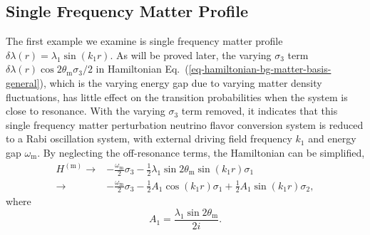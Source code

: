 \documentclass[%
reprint,
 amsmath,amssymb,
 aps,
]{revtex4-1}
\begin{document}





\subsection{\label{sec:single-freq}Single Frequency Matter Profile}


The first example we examine is single frequency matter profile $\delta\lambda(r) = \lambda_1 \sin(k_1 r)$. As will be proved later, the varying $\sigma_3$ term $\delta\lambda(r) \cos 2\theta_{\mathrm m} \sigma_3/2$ in Hamiltonian Eq.~(\ref{eq-hamiltonian-bg-matter-basis-general}), which is the varying energy gap due to varying matter density fluctuations, has little effect on the transition probabilities when the system is close to resonance. With the varying $\sigma_3$ term removed, it indicates that this single frequency matter perturbation neutrino flavor conversion system is reduced to a Rabi oscillation system, with external driving field frequency $k_1$ and energy gap $\omega_{\mathrm m}$. By neglecting the off-resonance terms, the Hamiltonian can be simplified,
\begin{align}
H^{(\mathrm{m})} \to & -\frac{\omega_{\mathrm m}}{2} \sigma_3  - \frac{1}{2} \lambda_1 \sin 2\theta_{\mathrm m} \sin( k_1 r ) \sigma_1\label{eq-hamiltonian-bg-matter-basis-single-frequency} \\
\to & -\frac{\omega_{\mathrm m}}{2} \sigma_3  - \frac{1}{2} A_1 \cos ( k_1 r)  \sigma_1 + \frac{1}{2} A_1\sin(k_1 r) \sigma_2,\nonumber 
\end{align}
where
\begin{equation}
A_1 = \frac{\lambda_1 \sin 2\theta_{\mathrm m} }{2i}.
\label{eq-define-a1}
\end{equation}
\end{document}

